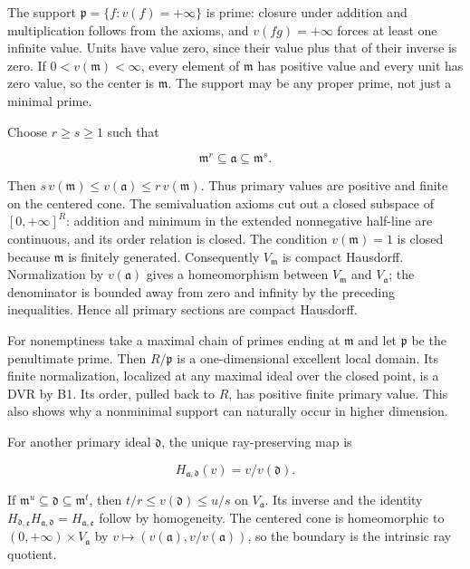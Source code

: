\documentclass[11pt]{article}
\begin{document}
The support \(\mathfrak p=\{f:v(f)=+\infty\}\) is prime: closure under addition and multiplication follows from the axioms, and \(v(fg)=+\infty\) forces at least one infinite value. Units have value zero, since their value plus that of their inverse is zero. If \(0<v(\mathfrak m)<\infty\), every element of \(\mathfrak m\) has positive value and every unit has zero value, so the center is \(\mathfrak m\). The support may be any proper prime, not just a minimal prime.

Choose \(r\geq s\geq1\) such that

\[
\mathfrak m^r\subseteq\mathfrak a\subseteq\mathfrak m^s.
\]

Then \(s\,v(\mathfrak m)\leq v(\mathfrak a)\leq r\,v(\mathfrak m)\). Thus primary values are positive and finite on the centered cone. The semivaluation axioms cut out a closed subspace of \([0,+\infty]^R\): addition and minimum in the extended nonnegative half-line are continuous, and its order relation is closed. The condition \(v(\mathfrak m)=1\) is closed because \(\mathfrak m\) is finitely generated. Consequently \(V_{\mathfrak m}\) is compact Hausdorff. Normalization by \(v(\mathfrak a)\) gives a homeomorphism between \(V_{\mathfrak m}\) and \(V_{\mathfrak a}\); the denominator is bounded away from zero and infinity by the preceding inequalities. Hence all primary sections are compact Hausdorff.

For nonemptiness take a maximal chain of primes ending at \(\mathfrak m\) and let \(\mathfrak p\) be the penultimate prime. Then \(R/\mathfrak p\) is a one-dimensional excellent local domain. Its finite normalization, localized at any maximal ideal over the closed point, is a DVR by B1. Its order, pulled back to \(R\), has positive finite primary value. This also shows why a nonminimal support can naturally occur in higher dimension.

For another primary ideal \(\mathfrak d\), the unique ray-preserving map is

\[
H_{\mathfrak a,\mathfrak d}(v)=v/v(\mathfrak d).
\]

If \(\mathfrak m^u\subseteq\mathfrak d\subseteq\mathfrak m^t\), then \(t/r\leq v(\mathfrak d)\leq u/s\) on \(V_{\mathfrak a}\). Its inverse and the identity \(H_{\mathfrak d,\mathfrak e}H_{\mathfrak a,\mathfrak d}=H_{\mathfrak a,\mathfrak e}\) follow by homogeneity. The centered cone is homeomorphic to \((0,+\infty)\times V_{\mathfrak a}\) by \(v\mapsto(v(\mathfrak a),v/v(\mathfrak a))\), so the boundary is the intrinsic ray quotient.
\end{document}
